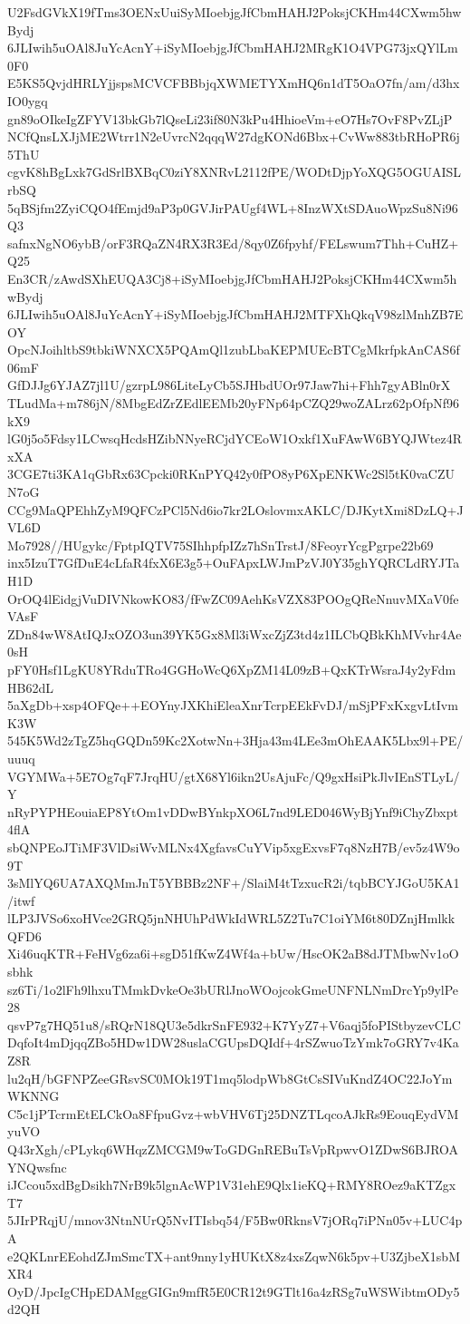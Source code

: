 U2FsdGVkX19fTms3OENxUuiSyMIoebjgJfCbmHAHJ2PoksjCKHm44CXwm5hwBydj
6JLIwih5uOAl8JuYcAcnY+iSyMIoebjgJfCbmHAHJ2MRgK1O4VPG73jxQYlLm0F0
E5KS5QvjdHRLYjjspsMCVCFBBbjqXWMETYXmHQ6n1dT5OaO7fn/am/d3hxIO0ygq
gn89oOIkeIgZFYV13bkGb7lQseLi23if80N3kPu4HhioeVm+eO7Hs7OvF8PvZLjP
NCfQnsLXJjME2Wtrr1N2eUvrcN2qqqW27dgKONd6Bbx+CvWw883tbRHoPR6j5ThU
cgvK8hBgLxk7GdSrlBXBqC0ziY8XNRvL2112fPE/WODtDjpYoXQG5OGUAISLrbSQ
5qBSjfm2ZyiCQO4fEmjd9aP3p0GVJirPAUgf4WL+8InzWXtSDAuoWpzSu8Ni96Q3
safnxNgNO6ybB/orF3RQaZN4RX3R3Ed/8qy0Z6fpyhf/FELswum7Thh+CuHZ+Q25
En3CR/zAwdSXhEUQA3Cj8+iSyMIoebjgJfCbmHAHJ2PoksjCKHm44CXwm5hwBydj
6JLIwih5uOAl8JuYcAcnY+iSyMIoebjgJfCbmHAHJ2MTFXhQkqV98zlMnhZB7EOY
OpcNJoihltbS9tbkiWNXCX5PQAmQl1zubLbaKEPMUEcBTCgMkrfpkAnCAS6f06mF
GfDJJg6YJAZ7jl1U/gzrpL986LiteLyCb5SJHbdUOr97Jaw7hi+Fhh7gyABln0rX
TLudMa+m786jN/8MbgEdZrZEdlEEMb20yFNp64pCZQ29woZALrz62pOfpNf96kX9
lG0j5o5Fdsy1LCwsqHcdsHZibNNyeRCjdYCEoW1Oxkf1XuFAwW6BYQJWtez4RxXA
3CGE7ti3KA1qGbRx63Cpcki0RKnPYQ42y0fPO8yP6XpENKWc2Sl5tK0vaCZUN7oG
CCg9MaQPEhhZyM9QFCzPCl5Nd6io7kr2LOslovmxAKLC/DJKytXmi8DzLQ+JVL6D
Mo7928//HUgykc/FptpIQTV75SIhhpfpIZz7hSnTrstJ/8FeoyrYcgPgrpe22b69
inx5IzuT7GfDuE4cLfaR4fxX6E3g5+OuFApxLWJmPzVJ0Y35ghYQRCLdRYJTaH1D
OrOQ4lEidgjVuDIVNkowKO83/fFwZC09AehKsVZX83POOgQReNnuvMXaV0feVAsF
ZDn84wW8AtIQJxOZO3un39YK5Gx8Ml3iWxcZjZ3td4z1ILCbQBkKhMVvhr4Ae0sH
pFY0Hsf1LgKU8YRduTRo4GGHoWcQ6XpZM14L09zB+QxKTrWsraJ4y2yFdmHB62dL
5aXgDb+xsp4OFQe++EOYnyJXKhiEleaXnrTcrpEEkFvDJ/mSjPFxKxgvLtIvmK3W
545K5Wd2zTgZ5hqGQDn59Kc2XotwNn+3Hja43m4LEe3mOhEAAK5Lbx9l+PE/uuuq
VGYMWa+5E7Og7qF7JrqHU/gtX68Yl6ikn2UsAjuFc/Q9gxHsiPkJlvIEnSTLyL/Y
nRyPYPHEouiaEP8YtOm1vDDwBYnkpXO6L7nd9LED046WyBjYnf9iChyZbxpt4flA
sbQNPEoJTiMF3VlDsiWvMLNx4XgfavsCuYVip5xgExvsF7q8NzH7B/ev5z4W9o9T
3sMlYQ6UA7AXQMmJnT5YBBBz2NF+/SlaiM4tTzxucR2i/tqbBCYJGoU5KA1/itwf
lLP3JVSo6xoHVce2GRQ5jnNHUhPdWkIdWRL5Z2Tu7C1oiYM6t80DZnjHmlkkQFD6
Xi46uqKTR+FeHVg6za6i+sgD51fKwZ4Wf4a+bUw/HscOK2aB8dJTMbwNv1oOsbhk
sz6Ti/1o2lFh9lhxuTMmkDvkeOe3bURlJnoWOojcokGmeUNFNLNmDrcYp9ylPe28
qsvP7g7HQ51u8/sRQrN18QU3e5dkrSnFE932+K7YyZ7+V6aqj5foPIStbyzevCLC
DqfoIt4mDjqqZBo5HDw1DW28uslaCGUpsDQIdf+4rSZwuoTzYmk7oGRY7v4KaZ8R
lu2qH/bGFNPZeeGRsvSC0MOk19T1mq5lodpWb8GtCsSIVuKndZ4OC22JoYmWKNNG
C5c1jPTcrmEtELCkOa8FfpuGvz+wbVHV6Tj25DNZTLqcoAJkRs9EouqEydVMyuVO
Q43rXgh/cPLykq6WHqzZMCGM9wToGDGnREBuTsVpRpwvO1ZDwS6BJROAYNQwsfnc
iJCcou5xdBgDsikh7NrB9k5lgnAcWP1V31ehE9Qlx1ieKQ+RMY8ROez9aKTZgxT7
5JIrPRqjU/mnov3NtnNUrQ5NvITIsbq54/F5Bw0RknsV7jORq7iPNn05v+LUC4pA
e2QKLnrEEohdZJmSmcTX+ant9nny1yHUKtX8z4xsZqwN6k5pv+U3ZjbeX1sbMXR4
OyD/JpcIgCHpEDAMggGIGn9mfR5E0CR12t9GTlt16a4zRSg7uWSWibtmODy5d2QH
